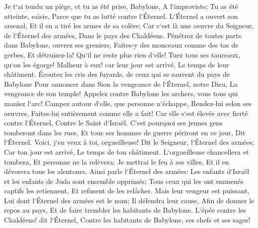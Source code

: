 \verse Je t`ai tendu un piège, et tu as été prise, Babylone, A l`improviste; Tu as été atteinte, saisie, Parce que tu as lutté contre l`Éternel. 
\verse L`Éternel a ouvert son arsenal, Et il en a tiré les armes de sa colère; Car c`est là une oeuvre du Seigneur, de l`Éternel des armées, Dans le pays des Chaldéens. 
\verse Pénétrez de toutes parts dans Babylone, ouvrez ses greniers, Faites-y des monceaux comme des tas de gerbes, Et détruisez-la! Qu`il ne reste plus rien d`elle! 
\verse Tuez tous ses taureaux, qu`on les égorge! Malheur à eux! car leur jour est arrivé, Le temps de leur châtiment. 
\verse Écoutez les cris des fuyards, de ceux qui se sauvent du pays de Babylone Pour annoncer dans Sion la vengeance de l`Éternel, notre Dieu, La vengeance de son temple! 
\verse Appelez contre Babylone les archers, vous tous qui maniez l`arc! Campez autour d`elle, que personne n`échappe, Rendez-lui selon ses oeuvres, Faites-lui entièrement comme elle a fait! Car elle s`est élevée avec fierté contre l`Éternel, Contre le Saint d`Israël. 
\verse C`est pourquoi ses jeunes gens tomberont dans les rues, Et tous ses hommes de guerre périront en ce jour, Dit l`Éternel. 
\verse Voici, j`en veux à toi, orgueilleuse! Dit le Seigneur, l`Éternel des armées; Car ton jour est arrivé, Le temps de ton châtiment. 
\verse L`orgueilleuse chancellera et tombera, Et personne ne la relèvera; Je mettrai le feu à ses villes, Et il en dévorera tous les alentours. 
\verse Ainsi parle l`Éternel des armées: Les enfants d`Israël et les enfants de Juda sont ensemble opprimés; Tous ceux qui les ont emmenés captifs les retiennent, Et refusent de les relâcher. 
\verse Mais leur vengeur est puissant, Lui dont l`Éternel des armées est le nom; Il défendra leur cause, Afin de donner le repos au pays, Et de faire trembler les habitants de Babylone. 
\verse L`épée contre les Chaldéens! dit l`Éternel, Contre les habitants de Babylone, ses chefs et ses sages! 
